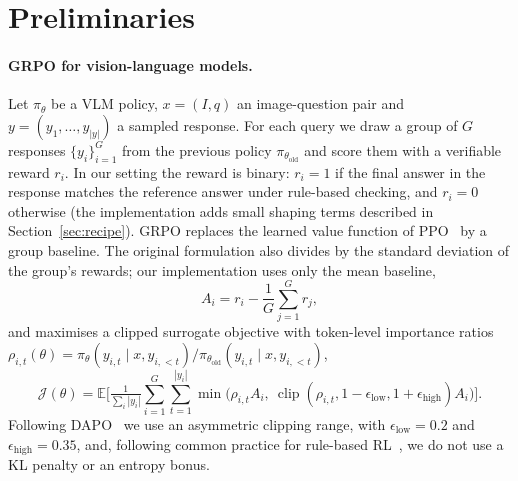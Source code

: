 \documentclass{article}
\begin{document}
\section{Preliminaries}
\label{sec:prelim}

\paragraph{GRPO for vision-language models.} Let $\pi_\theta$ be a VLM policy, $x=(I,q)$ an image-question pair and $y=(y_1,\dots,y_{|y|})$ a sampled response. For each query we draw a group of $G$ responses $\{y_i\}_{i=1}^{G}$ from the previous policy $\pi_{\theta_{\text{old}}}$ and score them with a verifiable reward $r_i$. In our setting the reward is binary: $r_i=1$ if the final answer in the response matches the reference answer under rule-based checking, and $r_i=0$ otherwise (the implementation adds small shaping terms described in Section~\ref{sec:recipe}). GRPO replaces the learned value function of PPO~\citep{ppo} by a group baseline. The original formulation also divides by the standard deviation of the group's rewards; our implementation uses only the mean baseline,
\begin{equation}
A_i=r_i-\frac{1}{G}\sum_{j=1}^{G}r_j,
\label{eq:adv}
\end{equation}
and maximises a clipped surrogate objective with token-level importance ratios $\rho_{i,t}(\theta)=\pi_\theta(y_{i,t}\mid x,y_{i,<t})/\pi_{\theta_{\text{old}}}(y_{i,t}\mid x,y_{i,<t})$,
\begin{equation}
\mathcal{J}(\theta)=\mathbb{E}\Big[\tfrac{1}{\sum_i |y_i|}\sum_{i=1}^{G}\sum_{t=1}^{|y_i|}\min\big(\rho_{i,t}A_i,\ \operatorname{clip}(\rho_{i,t},1-\epsilon_{\text{low}},1+\epsilon_{\text{high}})A_i\big)\Big].
\label{eq:grpo}
\end{equation}
Following DAPO~\citep{dapo} we use an asymmetric clipping range, with $\epsilon_{\text{low}}=0.2$ and $\epsilon_{\text{high}}=0.35$, and, following common practice for rule-based RL~\citep{drgrpo,dapo}, we do not use a KL penalty or an entropy bonus.
\end{document}
